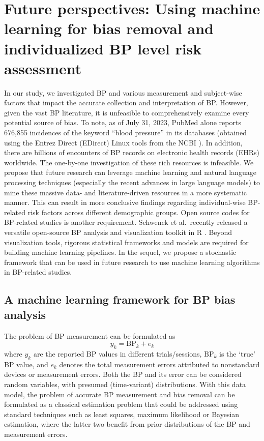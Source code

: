 \documentclass[journal,article,moreauthors]{Definitions/mdpi}
\begin{document}
\section{Future perspectives: Using machine learning for bias removal and individualized BP level risk assessment}\label{sec: Future}
In our study, we investigated BP and various measurement and subject-wise factors that impact the accurate collection and interpretation of BP. However, given the vast BP literature, it is unfeasible to comprehensively examine every potential source of bias. To note, as of July 31, 2023, PubMed alone reports 676,855 incidences of the keyword ``blood pressure'' in its databases (obtained using the Entrez Direct (EDirect) Linux tools from the NCBI \citep{EntrezDirect}). In addition, there are billions of encounters of BP records on electronic health records (EHRs) worldwide. The one-by-one investigation of these rich resources is infeasible. We propose that future research can leverage machine learning and natural language processing techniques (especially the recent advances in large language models) to mine these massive data- and literature-driven resources in a more systematic manner. This can result in more conclusive findings regarding individual-wise BP-related risk factors across different demographic groups. Open source codes for BP-related studies is another requirement. Schwenck et al.\ recently released a versatile open-source BP analysis and visualization toolkit in R \citep{Schwenck2022}. Beyond visualization tools, rigorous statistical frameworks and models are required for building machine learning pipelines. In the sequel, we propose a stochastic framework that can be used in future research to use machine learning algorithms in BP-related studies.

\subsection{A machine learning framework for BP bias analysis}
The problem of BP measurement can be formulated as
\begin{equation}
    y_k = \text{BP}_k + e_k
\label{eq:BP_data_model}    
\end{equation}
where $y_k$ are the reported BP values in different trials/sessions, $\text{BP}_k$ is the `true' BP value, and $e_k$ denotes the total measurement errors attributed to nonstandard devices or measurement errors. Both the BP and its error can be considered random variables, with presumed (time-variant) distributions. With this data model, the problem of accurate BP measurement and bias removal can be formulated as a classical estimation problem that could be addressed using standard techniques such as least squares, maximum likelihood or Bayesian estimation, where the latter two benefit from prior distributions of the BP and measurement errors.
\end{document}
